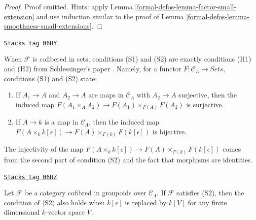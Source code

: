 \begin{proof}
Proof omitted. Hints: apply Lemma \ref{formal-defos-lemma-factor-small-extension}
and use induction similar to the proof of
Lemma \ref{formal-defos-lemma-smoothness-small-extensions}.
\end{proof}

\begin{remark}
\label{formal-defos-remark-compare-S1-S2-schlessinger}
\href{https://stacks.math.columbia.edu/tag/06HY}{\texttt{Stacks tag 06HY}}

When $\mathcal{F}$ is cofibered in sets, conditions (S1) and (S2) are exactly
conditions (H1) and (H2) from Schlessinger's paper \cite{Sch}.
Namely, for a functor $F: \mathcal{C}_\Lambda \to
\textit{Sets}$, conditions (S1) and (S2) state:
\begin{enumerate}
\item [(S1)] If $A_1 \to A$ and $A_2 \to A$ are maps in
$\mathcal{C}_\Lambda$ with $A_2 \to A$ surjective, then the induced
map $F(A_1 \times_A A_2) \to F(A_1) \times_{F(A)} F(A_2)$ is
surjective.
\item [(S2)]  If $A \to k$ is a map in $\mathcal{C}_\Lambda$, then the
induced map
$F(A \times_k k[\epsilon]) \to F(A) \times_{F(k)} F(k[\epsilon])$
is bijective.
\end{enumerate}
The injectivity of the map
$F(A \times_k k[\epsilon]) \to F(A) \times_{F(k)} F(k[\epsilon])$
comes from the second part of condition (S2) and the fact that morphisms
are identities.
\end{remark}

\begin{lemma}[S2 extensions]
\label{formal-defos-lemma-S2-extensions}
\href{https://stacks.math.columbia.edu/tag/06HZ}{\texttt{Stacks tag 06HZ}}

Let $\mathcal{F}$ be a category cofibred in groupoids over
$\mathcal{C}_\Lambda$. If $\mathcal{F}$ satisfies (S2), then the
condition of (S2) also holds when $k[\epsilon]$ is replaced by $k[V]$
for any finite dimensional $k$-vector space $V$.
\end{lemma}

